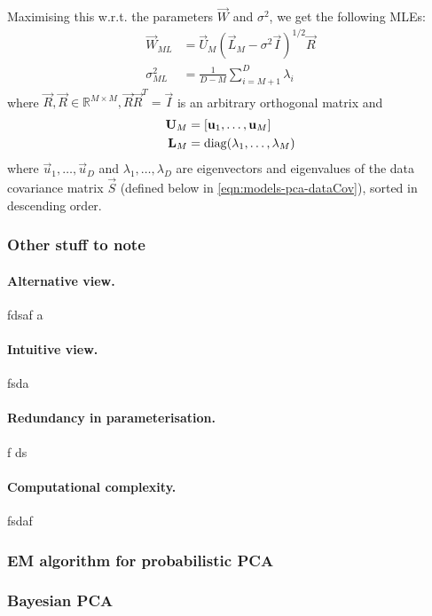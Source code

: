 Maximising this w.r.t. the parameters $\vec W$ and $\sigma^2$, we get the following MLEs:
\begin{align*}
    \vec W_{ML}     &= \vec U_M \left(\vec L_M - \sigma^2 \vec I \right)^{1 / 2} \vec R \\
    \sigma^2_{ML}   &= \frac{1}{D - M} \sum_{i = M + 1}^D \lambda_i
\end{align*}
where $\vec R, \vec R \in \mathbb R^{M \times M}, \vec R \vec R^T = \vec I$ is an arbitrary orthogonal matrix and
\begin{align*}
    \boldsymbol{\mathbf{U}}_M    &= \left[\boldsymbol{\mathbf{u}}_1, \dotsc, \boldsymbol{\mathbf{u}}_M \right] \\
    \boldsymbol{\mathbf{L}}_M    &= \operatorname{diag}(\lambda_1, \dotsc, \lambda_M)
\end{align*}
where $\vec u_1, \dotsc, \vec u_D$ and $\lambda_1, \dotsc, \lambda_D$ are eigenvectors and eigenvalues of the data covariance matrix $\vec S$ (defined below in \eqref{eqn:models-pca-dataCov}), sorted in descending order.

\subsubsection{Other stuff to note}
\paragraph{Alternative view.} fdsaf a
\paragraph{Intuitive view.} fsda 
\paragraph{Redundancy in parameterisation.} f ds
\paragraph{Computational complexity.}  fsdaf 

\subsubsection{EM algorithm for probabilistic PCA}

\subsubsection{Bayesian PCA}